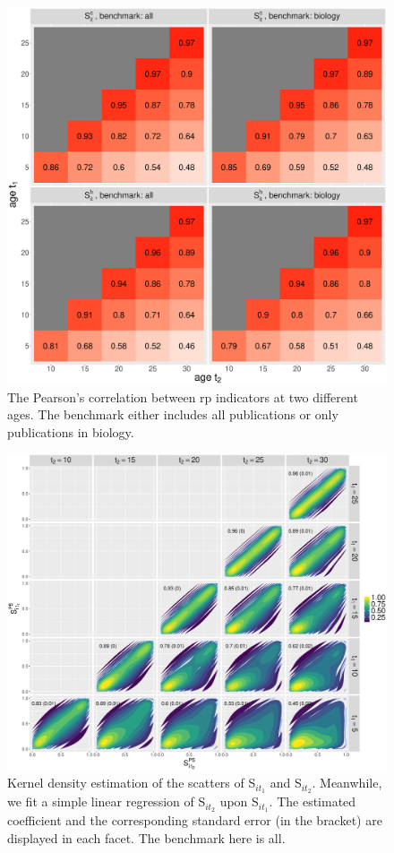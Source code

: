 \begin{refsection}
\begin{figure}[ht!]
    \centering
    \includegraphics[width=\textwidth]{figures/pred_power/current/heatmap_cor_autrp.eps}
    \caption{The Pearson's correlation between rp indicators at two different ages. The benchmark either includes all publications or only publications in biology.}
    \label{fig:hm_autrp_current}
\end{figure}


\begin{figure}[ht!]
    \centering
    \includegraphics[width=\textwidth]{figures/pred_power/autrp/scatter_all.eps}
    \caption{Kernel density estimation of the scatters of S$_{i t_1}$ and S$_{i t_2}$. Meanwhile, we fit a simple linear regression of S$_{i t_2}$ upon S$_{i t_1}$. The estimated coefficient and the corresponding standard error (in the bracket) are displayed in each facet. The benchmark here is all.}
    \label{fig:scatter_autrp_all}
\end{figure}


\end{refsection}
